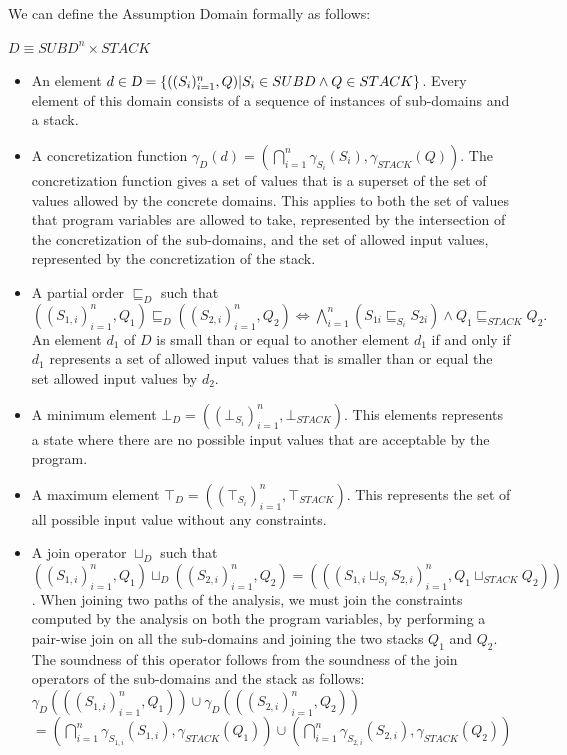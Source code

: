 \documentclass[10pt]{report}
\begin{document}
We can define the Assumption Domain formally as follows: \\
\begin{center}
	$D \equiv SUBD^{n} \times STACK$\\	
\end{center}
\begin{itemize}
	\item An element $d \in \textsl{D} = \lbrace ((S_{i})_{i=1}^{n}, Q) \vert S_{i} \in SUBD \wedge Q \in STACK \rbrace$. Every element of this domain consists of a sequence of instances of sub-domains and a stack.
	\item A concretization function $\gamma_{D}(d) =( \bigcap\limits_{i=1}^{n}\gamma_{S_{i}}(S_{i}), \gamma_{STACK}(Q)).$ The concretization function gives a set of values that is a superset of the set of values allowed by the concrete domains. This applies to both the set of values that program variables are allowed to take, represented by the intersection of the concretization of the sub-domains, and the set of allowed input values, represented by the concretization of the stack. 
	 
	\item A partial order $\sqsubseteq_{D}$ such that $ ((S_{1,i})_{i=1}^{n}, Q_{1}) \sqsubseteq_{D} ((S_{2, i})_{i=1}^{n}, Q_{2}) \Longleftrightarrow \bigwedge\limits_{i=1}^{n}(S_{1i} \sqsubseteq_{S_{i}} S_{2i}) \wedge Q_{1} \sqsubseteq_{STACK} Q_{2} .$ An element $ d_{1} $ of $ D $ is small than or equal to another element $ d_{1} $ if and only if $ d_{1} $ represents a set of allowed input values that is smaller than or equal the set allowed input values by $ d_{2} $. 
	\item A minimum element $\bot_{D} = ((\bot_{S_{i}})_{i=1}^{n}, \bot_{STACK})$. This elements represents a state where there are no possible input values that are acceptable by the program. 
	\item A maximum element $\top_{D} =  ((\top_{S_{i}})_{i=1}^{n}, \top_{STACK})$. This represents the set of all possible input value without any constraints. 
	\item A join operator $\sqcup_{D}$ such that $ ((S_{1,i})_{i=1}^{n}, Q_{1}) \sqcup_{D} ((S_{2,i})_{i=1}^{n}, Q_{2}) = (((S_{1,i} \sqcup_{S_{i}} S_{2,i})_{i=1}^{n}, Q_{1} \sqcup_{STACK} Q_{2}))$. When joining two paths of the analysis, we must join the constraints computed by the analysis on both the program variables, by performing a pair-wise join on all the sub-domains and joining the two stacks $ Q_{1} $ and $ Q_{2} $. The soundness of this operator follows from the soundness of the join operators of the sub-domains and the stack as follows: $ \gamma_{D}(((S_{1,i})_{i=1}^{n}, Q_{1})) \cup \gamma_{D}(((S_{2,i})_{i=1}^{n}, Q_{2}))$ $ = ( \bigcap\limits_{i=1}^{n}\gamma_{S_{1,i}}(S_{1,i}), \gamma_{STACK}(Q_{1})) \cup ( \bigcap\limits_{i=1}^{n}\gamma_{S_{2,i}}(S_{2,i}), \gamma_{STACK}(Q_{2})) $
	 

\end{itemize}
\end{document}
